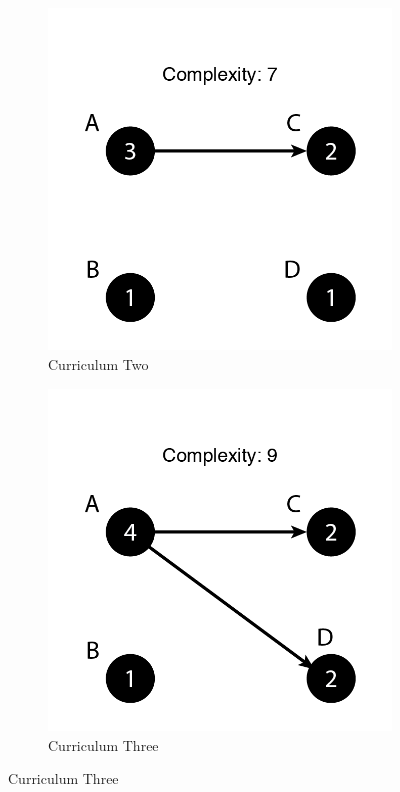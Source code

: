 \documentclass[botnum, fleqn]{unmeethesis}
\begin{document}
\begin{figure}
\begin{subfigure}[h!]{.3\linewidth}
\includegraphics[width=\linewidth]{./figures/Simple7.png}
\caption{Curriculum Two}\label{fig:simple7}
\end{subfigure}
\begin{subfigure}[h!]{.3\linewidth}
\includegraphics[width=\linewidth]{./figures/Simple9-1.png}
\caption{Curriculum Three}\label{fig:simple91}
\end{subfigure}


\end{figure}
\end{document}
